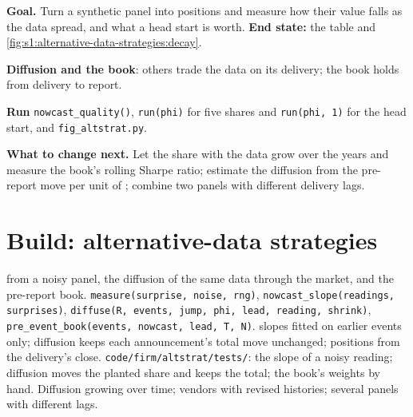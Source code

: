 \begin{tutorial}
\textbf{Goal.} Turn a synthetic panel into  positions and measure how their value falls as the data spread, and what a head start is worth.
\textbf{End state:} the table and \cref{fig:s1:alternative-data-strategies:decay}.
\begin{tutsteps}
\item \textbf{Diffusion and the book}: others trade the data on its delivery; the book holds from delivery to report.
\label{lst:s1:alternative-data-strategies:diffuse}
\item \textbf{Run} \texttt{nowcast\_quality()}, \texttt{run(phi)} for five shares and \texttt{run(phi, 1)} for the head start, and \texttt{fig\_altstrat.py}.
\end{tutsteps}
\textbf{What to change next.} Let the share with the data grow over the years and measure the book's rolling Sharpe ratio; estimate the diffusion from the
pre-report move per unit of ; combine two panels with different delivery lags.
\end{tutorial}

\section{Build: alternative-data strategies}\label{bld:s1:alternative-data-strategies:altstrat}

\begin{build}
  from a noisy panel, the diffusion of the same data through the market, and the pre-report book.
 \texttt{measure(surprise, noise, rng)}, \texttt{nowcast\_slope(readings, surprises)}, \texttt{diffuse(R, events, jump, phi, lead, reading,
shrink)}, \texttt{pre\_event\_book(events, nowcast, lead, T, N)}.
  slopes fitted on earlier events only; diffusion keeps each announcement's total move unchanged; positions from the delivery's close.
 \texttt{code/firm/altstrat/tests/}: the slope of a noisy reading; diffusion moves the planted share and keeps the total; the book's
weights by hand.
 Diffusion growing over time; vendors with revised histories; several panels with different lags.
\end{build}

